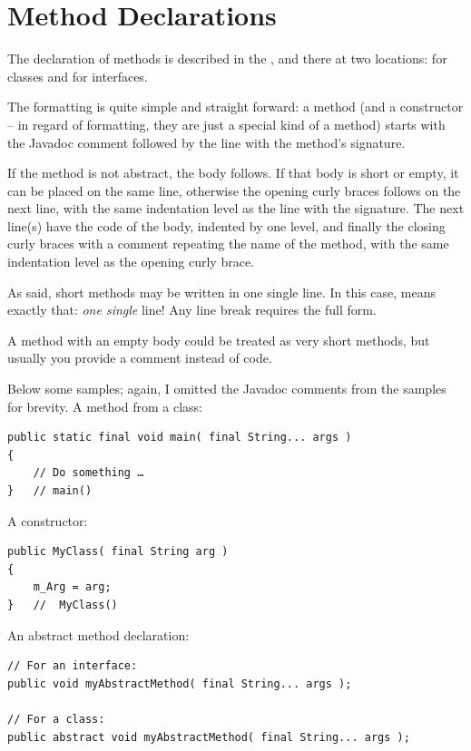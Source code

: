 \section{Method Declarations}
The declaration of methods is described in the \jlsref, and there at two locations: \autocite{ORACLE_DOC_LANGUAGE_SPECIFICATION:MethodDeclarationsClass} for classes and \autocite{ORACLE_DOC_LANGUAGE_SPECIFICATION:MethodDeclarationsInterface} for interfaces.

The formatting is quite simple and straight forward: a method (and a constructor – in regard of formatting, they are just a special kind of a method) starts with the Javadoc comment followed by the line with the method's signature.

If the method is not abstract, the body follows. If that body is short or empty, it can be placed on the same line, otherwise the opening curly braces follows on the next line, with the same indentation level as the line with the signature. The next line(s) have the code of the body, indented by one level, and finally the closing curly braces with a comment repeating the name of the method, with the same indentation level as the opening curly brace.

As said, short methods may be written in one single line. In this case,  means exactly that: \textit{one single} line! Any line break requires the full form.

A method with an empty body could be treated as very short methods, but usually you provide a comment instead of code.

Below some samples; again, I omitted the Javadoc comments from the samples for brevity.
A method from a class:
\begin{lstlisting}
public static final void main( final String... args ) 
{
    // Do something …
}   // main()
\end{lstlisting}

A constructor:
\begin{lstlisting}
public MyClass( final String arg )
{
    m_Arg = arg;
}   //  MyClass()
\end{lstlisting}

An abstract method declaration:
\begin{lstlisting}
// For an interface:
public void myAbstractMethod( final String... args );

// For a class:
public abstract void myAbstractMethod( final String... args );
\end{lstlisting}

